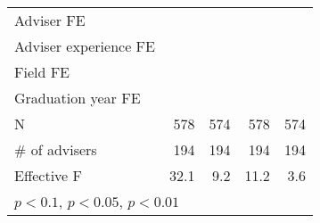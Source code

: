 {\begin{tabular}{l*{4}{D{.}{.}{-1}}}
\addlinespace
Adviser FE                    	&     \checkmark         	&     \checkmark         	&     \checkmark         	&     \checkmark         \\
\addlinespace
Adviser experience FE         	&     \checkmark         	&     \checkmark         	&     \checkmark         	&     \checkmark         \\
\addlinespace
Field FE                      	&     \checkmark         	&     \checkmark         	&     \checkmark         	&     \checkmark         \\
\addlinespace
Graduation year FE            	&     \checkmark         	&     \checkmark         	&     \checkmark         	&     \checkmark         \\
\midrule
N                             	&            578         	&            574         	&            578         	&            574         \\
\# of advisers                	&            194         	&            194         	&            194         	&            194         \\
Effective F                   	&           32.1         	&            9.2         	&           11.2         	&            3.6         \\
\bottomrule
{}\\
\end{tabular}
}
